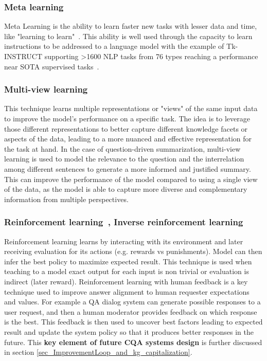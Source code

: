 \documentclass[acmsmall]{acmart}
\begin{document}
\subsubsection{Meta learning} \citep{debBoostingNaturalLanguage2022, upadhyaySharingLearnLearning2023, wangSuperNaturalInstructionsGeneralizationDeclarative2022}\label{sec_supervisedtraining_meta} Meta Learning is the ability to learn faster new tasks  with lesser data and time, like "learning to learn"~\citep{baxterTheoreticalModelsLearning1998, thrunLearningLearnIntroduction1998}. This ability is well used through the capacity to learn instructions to be addressed to a language model with the example of Tk-INSTRUCT supporting >1600 NLP tasks from 76 types reaching a performance near SOTA supervised tasks~\citep{wangSuperNaturalInstructionsGeneralizationDeclarative2022}.

\subsubsection{Multi-view learning} \citep{liLearningDiverseDocument2022, dengMultihopInferenceQuestiondriven2020}\label{sec_supervisedtraining_multiview} This technique learns multiple representations or "views" of the same input data to improve the model's performance on a specific task. The idea is to leverage those different representations to better capture different knowledge facets or aspects of the data, leading to a more nuanced and effective representation for the task at hand. In the case of question-driven summarization, multi-view learning is used to model the relevance to the question and the interrelation among different sentences to generate a more informed and justified summary. This can improve the performance of the model compared to using a single view of the data, as the model is able to capture more diverse and complementary information from multiple perspectives.

\subsubsection{Reinforcement learning~\citep{goyalRetrievalAugmentedReinforcementLearning2022, chiuKnowledgeGroundedReinforcementLearning2022}, Inverse reinforcement learning~\citep{zhouInverseReinforcementLearning2020}} \label{sec_supervisedtraining_RL}
Reinforcement learning learns by interacting with its environment and later receiving evaluation for its actions (e.g. rewards vs punishments). Model can then infer the best policy to maximize expected result. This technique is used when teaching to a model exact output for each input is non trivial or evaluation is indirect (later reward). Reinforcement learning with human feedback is a key technique used to improve answer alignment to human requester expectations and values. For example a QA dialog system can generate possible responses to a user request, and then a human moderator provides feedback on which response is the best. This feedback is then used to uncover best factors leading to expected result and update the system policy so that it produces better responses in the future. This \textbf{key element of future CQA systems design} is further discussed in section \ref{sec_ImprovementLoop_and_kg_capitalization}.
\end{document}
